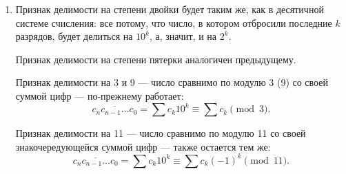 \begin{enumerate}
\item Признак делимости на степени двойки будет таким же, как в десятичной системе счисления: все потому, что число, в котором отбросили последние $k$ разрядов, будет делиться на $10^k$, а, значит, и на $2^k$.

Признак делимости на степени пятерки аналогичен предыдущему.

Признак делимости на 3 и 9 — число сравнимо по модулю 3 (9) со своей суммой цифр — по-прежнему работает:
$$\overline{c_nc_{n-1}\ldots c_0} = \sum c_k10^k \equiv \sum c_k \pmod 3.$$

Признак делимости на 11 — число сравнимо по модулю 11 со своей знакочередующейся суммой цифр — также остается тем же:
$$\overline{c_nc_{n-1}\ldots c_0} = \sum c_k10^k \equiv \sum c_k(-1)^k \pmod{11}.$$

\end{enumerate}
